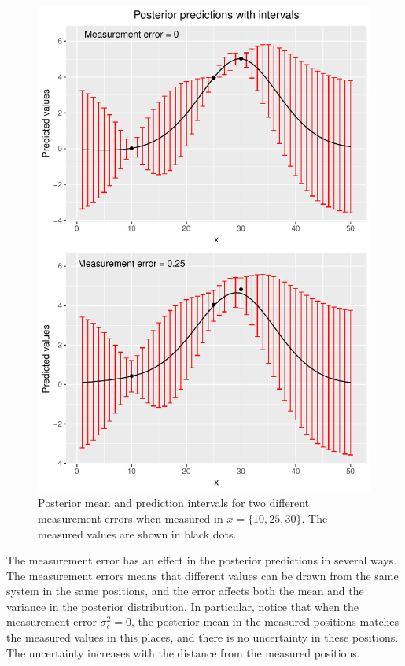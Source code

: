 \begin{figure}
    \centering
    \includegraphics[scale=0.95]{figures/predictions.pdf}
    \caption{Posterior mean and prediction intervals for two different measurement errors when measured in $x = \{10,25,30\}$. The measured values are shown in black dots.}
    \label{fig:predictions}
\end{figure}

The measurement error has an effect in the posterior predictions in several ways. The measurement errors means that different values can be drawn from the same system in the same positions, and the error affects both the mean and the variance in the posterior distribution. In particular, notice that when the measurement error $\sigma^2_{\epsilon} = 0$, the posterior mean in the measured positions matches the measured values in this places, and there is no uncertainty in these positions. The uncertainty increases with the distance from the measured positions.

